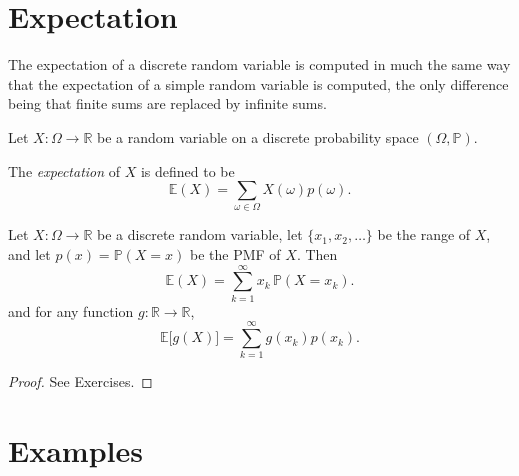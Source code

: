 \documentclass[lecture]{csm}
\newcommand{\prob}{\mathbb{P}}
\newcommand{\expe}{\mathbb{E}}
\newcommand{\R}{\mathbb{R}}
\begin{document}
\newpage
\section{Expectation}
The expectation of a discrete random variable is computed in much the same way that the expectation of a simple random variable is computed, the only difference being that finite sums are replaced by infinite sums.

\begin{definition}
Let $X:\Omega\to\R$ be a random variable on a discrete probability space $(\Omega,\prob)$. 
\par
The \emph{expectation} of $X$ is defined to be
\[
\expe(X) = \sum_{\omega\in\Omega} X(\omega)p(\omega).
\]
\end{definition}

\newpage

\begin{theorem}
Let $X:\Omega\to\R$ be a discrete random variable, let $\{x_1,x_2,\ldots\}$ be the range of $X$, and let $p(x) = \prob(X=x)$ be the PMF of $X$.
Then
\[
\expe(X) = \sum_{k=1}^{\infty} x_k\,\prob(X=x_k).
\]
and for any function $g:\R\to\R$,
\[
\expe\big[g(X)\big] = \sum_{k=1}^{\infty} g(x_k)p(x_k).
\]
\end{theorem}


\begin{proof}
See Exercises.
\end{proof}

\newpage
\section{Examples}
\end{document}
